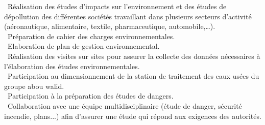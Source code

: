 \documentclass[
  a4paper, 
]{fortysecondscv}
\begin{document}
\makefrontsidebar
{}
\begin{cvtable}
		{\faArrowCircleRight\ Réalisation des études d’impacts sur l’environnement et des études de dépollution des différentes sociétés travaillant dans plusieurs secteurs d’activité (aéronautique, alimentaire, textile, pharmaceutique, automobile,…).
		\\ \faArrowCircleRight\ Préparation de cahier des charges environnementales.
		\\ \faArrowCircleRight\ Elaboration de plan de gestion environnemental.
		\\ \faArrowCircleRight\ Réalisation des visites sur sites pour assurer la collecte des données nécessaires à l’élaboration des études environnementales.
		\\ \faArrowCircleRight\ Participation au dimensionnement de la station de traitement des eaux usées du groupe abou walid.
		\\ \faArrowCircleRight\ Participation  à la préparation des études de dangers.
		\\ \faArrowCircleRight\ Collaboration avec une équipe multidisciplinaire (étude de danger, sécurité incendie, plans...)  afin d’assurer une étude qui répond aux exigences des autorités.}
			

\end{cvtable}
\end{document}
